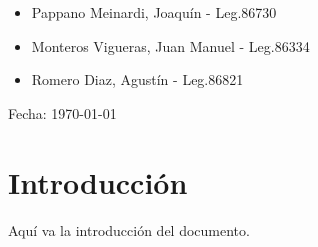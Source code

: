 \documentclass[12pt, letterpaper]{article}
\begin{document}
\begin{titlepage}
            \begin{itemize}
                \item{\Large Pappano Meinardi, Joaquín - Leg.86730\par}
                \item{\Large Monteros Vigueras, Juan Manuel - Leg.86334\par}
                \item{\Large Romero Diaz, Agustín - Leg.86821\par}
            \end{itemize}
        \vspace{0.5cm}
        {\Large Fecha: {\today} \par}%
    \end{titlepage}

\newpage
\tableofcontents
\newpage

\section{Introducción}

Aquí va la introducción del documento.
\end{document}
